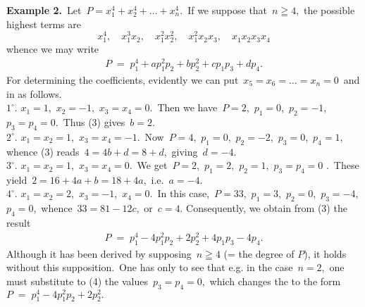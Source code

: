 \documentclass[12pt]{article}
\theoremstyle{definition}
\begin{document}
\textbf{Example 2.}\, Let \,$P = x_1^4\!+\!x_2^4\!+\ldots+\!x_n^4$.\, If we suppose that\, $n \geqq 4$,\, the possible highest terms are
$$x_1^4, \quad x_1^3x_2, \quad x_1^2x_2^2, \quad x_1^2x_2x_3, \quad x_1x_2x_3x_4$$
whence we may write
\begin{align}
P \;=\; p_1^4\!+\!ap_1^2p_2\!+\!bp_2^2\!+\!cp_1p_3\!+\!dp_4.
\end{align}
For determining the coefficients, evidently we can put\, $x_5 = x_6 = \ldots = x_n = 0$\, and in  as follows.\\
$1^\circ$.\; $x_1 =1$,\, $x_2 = -1$,\, $x_3 = x_4 = 0$.\, Then we have\, $P = 2$,\, $p_1 = 0$,\, $p_2 = -1$,\, 
$p_3 = p_4 = 0$.\, Thus (3) gives\, $b = 2$.\\
$2^\circ$.\; $x_1 = x_2 = 1$,\, $x_3 = x_4 = -1$.\, Now\, $P = 4$,\, $p_1 = 0$,\, $p_2 = -2$,\, $p_3 =0$,\, $p_4 = 1$,\, whence (3) reads\, $4 = 4b\!+\!d = 8\!+\!d$,\, giving\, $d = -4$.\\
$3^\circ$.\; $x_1 = x_2 = 1$,\, $x_3 = x_4 = 0$.\, We get\, $P = 2$,\, $p_1 = 2$,\, $p_2 = 1$,\, $p_3 = p_4 = 0$ .\, These yield\, $2 = 16\!+\!4a\!+\!b = 18\!+\!4a$,\, i.e.\, $a = -4$.\\
$4^\circ$.\; $x_1 = x_2 = 2$,\, $x_3 = -1$,\, $x_4 = 0$.\, In this case,\, $P = 33$,\, $p_1 = 3$,\, $p_2 = 0$,\, 
$p_3 = -4$,\, $p_4 = 0$,\, whence\, $33 = 81-12c$,\, or\, $c = 4$.\; Consequently, we obtain from (3) the result
\begin{align}
P \;=\; p_1^4\!-\!4p_1^2p_2\!+\!2p_2^2\!+\!4p_1p_3\!-\!4p_4.
\end{align}
Although it has been derived by supposing\, $n \geqq 4$ (= the degree of $P$), it holds without this supposition.\, One has only to see that e.g. in the case\, $n = 2$,\, one must substitute to (4) the values\, $p_3 = p_4 = 0$,\, which changes the  to the form\, $P \;=\; p_1^4\!-\!4p_1^2p_2\!+\!2p_2^2.$







\end{document}
